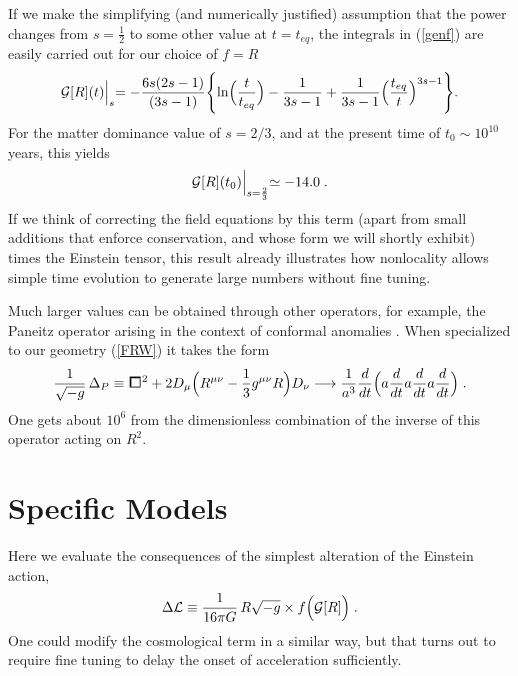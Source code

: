 \documentclass[12pt]{article}
\def\square{\kern1pt\vbox{\hrule height 1.2pt\hbox{\vrule width 1.2pt\hskip 3pt
   \vbox{\vskip 6pt}\hskip 3pt\vrule width 0.6pt}\hrule height 0.6pt}\kern1pt}
\begin{document}
If we make the simplifying (and numerically justified) assumption that the 
power changes from $s=\frac12$ to some other value at $t = t_{eq}$, the 
integrals in (\ref{genf}) are easily carried out for our choice of $f = R$
\begin{equation}
\mathcal{G}[R](t) \Bigl\vert_{s} = -\frac{6 s (2s-1)}{(3s-1)}
\Biggl\{ \ln\Bigl(\frac{t}{t_{eq}}\Bigr) - \frac1{3s -1} + \frac1{3s-1}
\Bigl(\frac{t_{eq}}{t}\Bigr)^{3s-1}\Biggr\} . \label{gfac}
\end{equation}
For the matter dominance value of $s = 2/3$, and at the present time of
$t_0 \sim 10^{10}$ years, this yields
\begin{equation}
\mathcal{G}[R](t_0) \Bigl\vert_{s=\frac23} \simeq -14.0 \; .
\end{equation}
If we think of correcting the field equations by this term (apart from small
additions that enforce conservation, and whose form we will shortly exhibit) 
times the Einstein tensor, this result already illustrates how nonlocality 
allows simple time evolution to generate large numbers without fine tuning.

Much larger values can be obtained through other operators, for example,
the Paneitz operator arising in the context of conformal anomalies \cite{SD}. 
When specialized to our geometry (\ref{FRW}) it takes the form
\begin{equation}
\frac1{\sqrt{-g}} \, \Delta_P \equiv \square^2 + 2 D_{\mu} \Bigl(
R^{\mu\nu} - \frac13 g^{\mu\nu} R\Bigr) D_{\nu} \longrightarrow
\frac1{a^3} \frac{d}{dt} \Bigl(a \frac{d}{dt} a \frac{d}{dt} a 
\frac{d}{dt} \Bigr) \; .
\end{equation}
One gets about $10^6$ from the dimensionless combination of the inverse of
this operator acting on $R^2$.

\section{Specific Models}

Here we evaluate the consequences of the simplest alteration of the
Einstein action,
\begin{equation}
\Delta \mathcal{L} \equiv \frac1{16 \pi G} \, R \sqrt{-g} \times
f\Bigl(\mathcal{G}[R]\Bigr) \; . \label{DL2}
\end{equation}
One could modify the cosmological term in a similar way, but that turns
out to require fine tuning to delay the onset of acceleration sufficiently.
\end{document}
